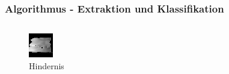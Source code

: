\begin{frame}
    \frametitle{Algorithmus - Extraktion und Klassifikation}
    \begin{columns}
        \begin{column}{.5\textwidth}
            \begin{figure}
                \centering
                \includegraphics[width=\textwidth]{../Material/Presentation/image_0.png}
                \caption{Hindernis}
            \end{figure}
        \end{column}
        \begin{column}{.5\textwidth}
            \begin{figure}
                \centering

\end{figure}
\end{column}
\end{columns}
\end{frame}
